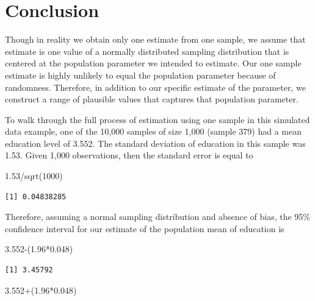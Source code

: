 \documentclass[
]{book}
\makeatletter
\newenvironment{Shaded}{\begin{snugshade}}{\end{snugshade}}
\newcommand{\DecValTok}[1]{\textcolor[rgb]{0.06,0.06,0.06}{#1}}
\newcommand{\FloatTok}[1]{\textcolor[rgb]{0.06,0.06,0.06}{#1}}
\newcommand{\FunctionTok}[1]{\textcolor[rgb]{0,0,0}{#1}}
\newcommand{\NormalTok}[1]{#1}
\newcommand{\SpecialCharTok}[1]{\textcolor[rgb]{0,0,0}{#1}}
\newenvironment{kframe}{%
\medskip{}
\setlength{\fboxsep}{.8em}
 \def\at@end@of@kframe{}%
 \ifinner\ifhmode%
  \def\at@end@of@kframe{\end{minipage}}%
  \begin{minipage}{\columnwidth}%
 \fi\fi%
 \def\FrameCommand##1{\hskip\@totalleftmargin \hskip-\fboxsep
 \colorbox{shadecolor}{##1}\hskip-\fboxsep
     \hskip-\linewidth \hskip-\@totalleftmargin \hskip\columnwidth}%
 \MakeFramed {\advance\hsize-\width
   \@totalleftmargin\z@ \linewidth\hsize
   \@setminipage}}%
 {\par\unskip\endMakeFramed%
 \at@end@of@kframe}
\renewenvironment{Shaded}{\begin{kframe}}{\end{kframe}}
\makeatother
\begin{document}
\hypertarget{conclusion}{%
\section{Conclusion}\label{conclusion}}

Though in reality we obtain only one estimate from one sample, we assume that estimate is one value of a normally distributed sampling distribution that is centered at the population parameter we intended to estimate. Our one sample estimate is highly unlikely to equal the population parameter because of randomness. Therefore, in addition to our specific estimate of the parameter, we construct a range of plausible values that captures that population parameter.

To walk through the full process of estimation using one sample in this simulated data example, one of the 10,000 samples of size 1,000 (sample 379) had a mean education level of 3.552. The standard deviation of education in this sample was 1.53. Given 1,000 observations, then the standard error is equal to

\begin{Shaded}
\begin{Highlighting}[]
\FloatTok{1.53}\SpecialCharTok{/}\FunctionTok{sqrt}\NormalTok{(}\DecValTok{1000}\NormalTok{)}
\end{Highlighting}
\end{Shaded}

\begin{verbatim}
[1] 0.04838285
\end{verbatim}

Therefore, assuming a normal sampling distribution and absence of bias, the 95\% confidence interval for our estimate of the population mean of education is

\begin{Shaded}
\begin{Highlighting}[]
\FloatTok{3.552}\SpecialCharTok{{-}}\NormalTok{(}\FloatTok{1.96}\SpecialCharTok{*}\FloatTok{0.048}\NormalTok{)}
\end{Highlighting}
\end{Shaded}

\begin{verbatim}
[1] 3.45792
\end{verbatim}

\begin{Shaded}
\begin{Highlighting}[]
\FloatTok{3.552}\SpecialCharTok{+}\NormalTok{(}\FloatTok{1.96}\SpecialCharTok{*}\FloatTok{0.048}\NormalTok{)}
\end{Highlighting}
\end{Shaded}
\end{document}
